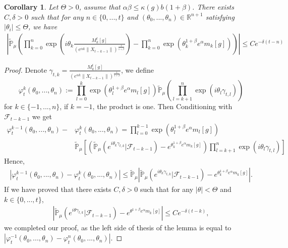 \documentclass{article}
\newtheorem{corollary}{Corollary}[section]
\begin{document}
\begin{corollary}\label{corollary31}
Let $\Theta>0$, assume that $\alpha\beta\leq\kappa(g)b(1+\beta)$. There exists $C,\delta>0$ such that for any $n \in \{0,...,t\}$ and $(\theta_0,...,\theta_n)\in \mathbb{R}^{n+1}$ satisfying $|\theta_i|\leq \Theta$, we have
\begin{align*}
    \left|\mathbb{\tilde{P}}_{\mu}\left(\prod_{k=0}^n\exp(i\theta_k \frac {M_k^t[g]}{(e^{\alpha k}\|X_{t-k-1}\|)^\frac{1}{1+\beta}})-\prod_{k=0}^n\exp(\theta_k^{1+\beta}e^{\alpha}m_k[g])\right)\right|\leq Ce^{-\delta(t-n)}
\end{align*}
\end{corollary}
\begin{proof}
    Denote $\gamma_{t,k}=\frac {M_k^t[g]}{(e^{\alpha k}\|X_{t-k-1}\|)^\frac{1}{1+\beta}} $, we define 
    $$\varphi^k_t(\theta_0,...,\theta_n):=\prod_{l=0}^{k}\exp\left(\theta_l^{1+\beta}e^{\alpha}m_l[g]\right)\mathbb{\tilde{P}}_{\mu}\left(\prod_{l=k+1}^{n}\exp\left(i\theta_l\gamma_{t,l}\right)\right)$$
    for $k\in\{-1,...,n\}$, if $k=-1$, the product is one. Then Conditioning with $\mathcal{F}_{t-k-1}$ we get
    \begin{align*}
        \varphi^{k-1}_t(\theta_0,...,\theta_n)-&\varphi^{k}_t(\theta_0,...,\theta_n)=\prod_{l=0}^{k-1}\exp\left(\theta_l^{1+\beta}e^{\alpha}m_l[g]\right)\\
        &\mathbb{\tilde{P}}_{\mu}\left[\left(\mathbb{\tilde{P}}_{\mu}\left(e^{i\theta_k \gamma_{t,k}}|\mathcal{F}_{t-k-1}\right)-e^{\theta_k^{1+\beta}e^{\alpha}m_k[g]}\right)\prod_{l=k+1}^n\exp(i\theta_l \gamma_{t,l})\right]
    \end{align*}
    Hence,
    \begin{align*}
        \left|\varphi^{k-1}_t(\theta_0,...,\theta_n)-\varphi^{k}_t(\theta_0,...,\theta_n)\right| \leq \mathbb{\tilde{P}}_{\mu}\left|\mathbb{\tilde{P}}_{\mu}\left(e^{i\theta_k \gamma_{t,k}}|\mathcal{F}_{t-k-1}\right)-e^{\theta_k^{1+\beta}e^{\alpha}m_k[g]}\right|.
    \end{align*}
    If we have proved that there exists $C,\delta>0$ such that for any $|\theta|<\Theta$ and $k\in \{0,...,t\}$,
    \begin{align}
        \left|\mathbb{\tilde{P}}_{\mu}\left(e^{i\theta \gamma_{t,k}}|\mathcal{F}_{t-k-1}\right)-e^{\theta^{1+\beta}e^{\alpha}m_k[g]}\right|\leq C e^{-\delta(t-k)},
    \end{align}
    we completed our proof, as the left side of thesis of the lemma is equal to $\left|\varphi^{-1}_t(\theta_0,...,\theta_n)-\varphi^{n}_t(\theta_0,...,\theta_n)\right|$.
    

\end{proof}
\end{document}
